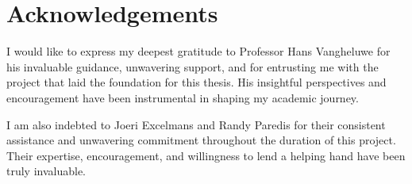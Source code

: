 \clearpage 
{} 
{}
\chapter*{Acknowledgements}
I would like to express my deepest gratitude to Professor Hans Vangheluwe for his invaluable guidance, unwavering support, and for entrusting me with the project that laid the foundation for this thesis. His insightful perspectives and encouragement have been instrumental in 
shaping my academic journey.

I am also indebted to Joeri Excelmans and Randy Paredis for their consistent assistance and unwavering commitment throughout the duration of this project. Their expertise, encouragement, and willingness to lend a helping hand have been truly invaluable.
